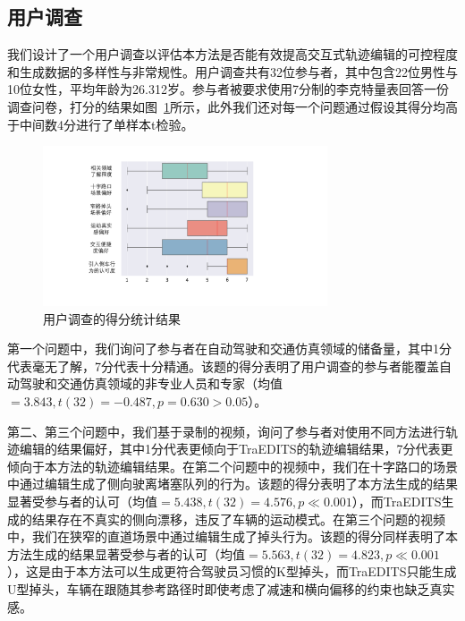 \subsection{用户调查}
\label{section:reversing_userstudy}

我们设计了一个用户调查以评估本方法是否能有效提高交互式轨迹编辑的可控程度和生成数据的多样性与非常规性。用户调查共有32位参与者，其中包含22位男性与10位女性，平均年龄为26.312岁。参与者被要求使用7分制的李克特量表回答一份调查问卷，打分的结果如图~\ref{fig:reversing_userstudy}所示，此外我们还对每一个问题通过假设其得分均高于中间数4分进行了单样本t检验。


\begin{figure}[!tbh]
\centering
\includegraphics[width=0.75\textwidth]{figure/reversing/user study cn.pdf}
\caption[用户调查的得分统计结果]{
用户调查的得分统计结果
}
\label{fig:reversing_userstudy}
\end{figure}

第一个问题中，我们询问了参与者在自动驾驶和交通仿真领域的储备量，其中1分代表毫无了解，7分代表十分精通。该题的得分表明了用户调查的参与者能覆盖自动驾驶和交通仿真领域的非专业人员和专家（均值$=3.843, t(32)=-0.487, p=0.630>0.05$）。

第二、第三个问题中，我们基于录制的视频，询问了参与者对使用不同方法进行轨迹编辑的结果偏好，其中1分代表更倾向于TraEDITS的轨迹编辑结果，7分代表更倾向于本方法的轨迹编辑结果。在第二个问题中的视频中，我们在十字路口的场景中通过编辑生成了侧向驶离堵塞队列的行为。该题的得分表明了本方法生成的结果显著受参与者的认可（均值$=5.438, t(32)=4.576, p \ll 0.001$），而TraEDITS生成的结果存在不真实的侧向漂移，违反了车辆的运动模式。在第三个问题的视频中，我们在狭窄的直道场景中通过编辑生成了掉头行为。该题的得分同样表明了本方法生成的结果显著受参与者的认可（均值$=5.563, t(32)=4.823, p \ll 0.001$），这是由于本方法可以生成更符合驾驶员习惯的K型掉头，而TraEDITS只能生成U型掉头，车辆在跟随其参考路径时即使考虑了减速和横向偏移的约束也缺乏真实感。

